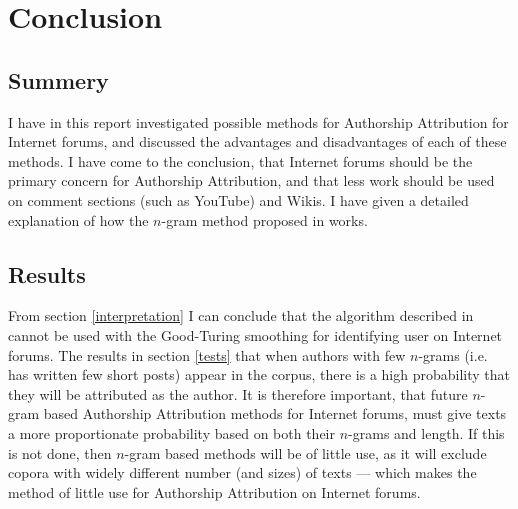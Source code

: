 

\section{Conclusion}
\label{conclusion}

\subsection{Summery}
I have in this report investigated possible methods for Authorship Attribution for Internet forums, and discussed the advantages and disadvantages of each of these methods. I have come to the conclusion, that Internet forums should be the primary concern for Authorship Attribution, and that less work should be used on comment sections (such as YouTube) and Wikis.  I have given a detailed explanation of how the $n$-gram method proposed in \cite{nr4} works. 

\subsection{Results}
From section \ref{interpretation} I can conclude that the algorithm described in \cite{nr4} cannot be used with the Good-Turing smoothing for identifying user on Internet forums. The results in section \ref{tests} that when authors with few $n$-grams (i.e. has written few short posts) appear in the corpus, there is a high probability that they will be attributed as the author. It is therefore important, that future $n$-gram based Authorship Attribution methods for Internet forums, must give texts a more proportionate probability based on both their $n$-grams and length. If this is not done, then $n$-gram based methods will be of little use, as it will exclude copora with widely different number (and sizes) of texts --- which makes the method of little use for Authorship Attribution on Internet forums. 

